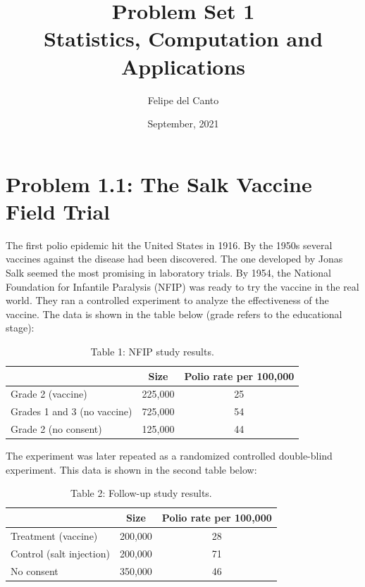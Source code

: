 \documentclass[11pt, english]{article}
\title{\bf Problem Set 1 \\ Statistics, Computation and
Applications\\[-1ex]}
\author{Felipe del Canto}
\date{September, 2021}
\begin{document}
    
    \maketitle
    
    \hypertarget{problem-1.1-the-salk-vaccine-field-trial}{%
\section*{\texorpdfstring{\textbf{Problem 1.1:} The Salk Vaccine Field
Trial}{Problem 1.1: The Salk Vaccine Field Trial}}\label{problem-1.1-the-salk-vaccine-field-trial}}

The first polio epidemic hit the United States in 1916. By the 1950s
several vaccines against the disease had been discovered. The one
developed by Jonas Salk seemed the most promising in laboratory trials.
By 1954, the National Foundation for Infantile Paralysis (NFIP) was
ready to try the vaccine in the real world. They ran a controlled
experiment to analyze the effectiveness of the vaccine. The data is
shown in the table below (grade refers to the educational stage):

\begin{table}[H]
\caption{Table 1: NFIP study results.}
\centering
\begin{tabular}{lcc}
\toprule
& Size & Polio rate per 100,000 \\
\midrule
Grade 2 (vaccine) & 225,000 & 25 \\
Grades 1 and 3 (no vaccine) & 725,000 & 54 \\
Grade 2 (no consent) & 125,000 & 44 \\
\bottomrule
\end{tabular}
\end{table}

The experiment was later repeated as a randomized controlled
double-blind experiment. This data is shown in the second table below:

\begin{table}[H]
\caption{Table 2: Follow-up study results.}
\centering
\begin{tabular}{lcc}
\toprule
& Size & Polio rate per 100,000 \\
\midrule
Treatment (vaccine) & 200,000 & 28 \\
Control (salt injection) & 200,000 & 71 \\
No consent & 350,000 & 46 \\
\bottomrule
\end{tabular}
\end{table}
\end{document}
